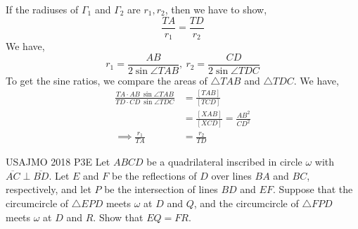 \begin{minipage}{.5\linewidth}
    \begin{solution}
        If the radiuses of $ \Gamma_1 $ and $ \Gamma_2 $ are $ r_1, r_2 $, then we
        have to show,
        \[\frac{TA}{r_1}=\frac{TD}{r_2}\]
        We have, 
        \[r_1= \frac{AB}{2\sin\angle TAB},\ r_2= \frac{CD}{2\sin\angle TDC}\]
        To get the sine ratios, we compare the areas of $ \triangle TAB $ and $
        \triangle TDC $. We have, 
        \[\begin{aligned}
            \frac{TA\cdot AB\ \sin\angle TAB}{TD\cdot CD\ \sin\angle TDC} &=
            \frac{[TAB]}{[TCD]}\\
            &= \frac{[XAB]}{[XCD]} = \frac{AB^2}{CD^2}\\[.7em]
            \implies \frac{r_1}{TA}&=\frac{r_2}{TD}
        \end{aligned}\]
    \end{solution}
\end{minipage}\hfill%
\begin{minipage}{.5\linewidth}
\end{minipage}

\begin{minipage}{.5\linewidth}
    {USAJMO 2018 P3}{E}{
        Let $ABCD$ be a quadrilateral inscribed in circle $\omega$ with
        $\overline{AC} \perp \overline{BD}$. Let $E$ and $F$ be the
        reflections of $D$ over lines $BA$ and $BC$, respectively, and let $P$
        be the intersection of lines $BD$ and $EF$. Suppose that the
        circumcircle of $\triangle EPD$ meets $\omega$ at $D$ and $Q$, and the
        circumcircle of $\triangle FPD$ meets $\omega$ at $D$ and $R$. Show
        that $EQ = FR$.
    } 
\end{minipage}\hfill%
\begin{minipage}{.45\linewidth}
\end{minipage}






